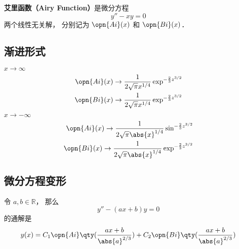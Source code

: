 
\begin{issues}
\issueDraft
\end{issues}

\textbf{艾里函数（Airy Function）}是微分方程
\begin{equation}
y'' - xy = 0
\end{equation}
两个线性无关解， 分别记为 $\opn{Ai}(x)$ 和 $\opn{Bi}(x)$．

\subsection{渐进形式}
$x \to \infty$
\begin{align}
\opn{Ai}(x) \to \frac{1}{2\sqrt{\pi} x^{1/4}} \exp^{-\frac{2}{3}z^{3/2}}\\
\opn{Bi}(x) \to \frac{1}{2\sqrt{\pi} x^{1/4}} \exp^{-\frac{2}{3}z^{3/2}}
\end{align}
$x \to -\infty$
\begin{align}
\opn{Ai}(x) \to \frac{1}{2\sqrt{\pi} \abs{x}^{1/4}} \sin^{-\frac{2}{3}z^{3/2}}\\
\opn{Bi}(x) \to \frac{1}{2\sqrt{\pi} \abs{x}^{1/4}} \exp^{-\frac{2}{3}z^{3/2}}
\end{align}

\subsection{微分方程变形}
令 $a, b\in \mathbb R$， 那么
\begin{equation}
y'' - (ax + b) y = 0
\end{equation}
的通解是
\begin{equation}\label{AiryF_eq1}
y(x) = C_1\opn{Ai}\qty(\frac{ax+b}{\abs{a}^{2/3}}) + C_2 \opn{Bi}\qty(\frac{ax+b}{\abs{a}^{2/3}})
\end{equation}
